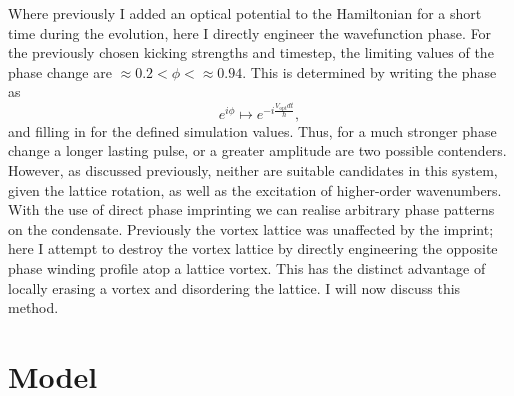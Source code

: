 Where previously I added an optical potential to the Hamiltonian for a short time during the evolution, here I directly engineer the wavefunction phase. For the previously chosen kicking strengths and timestep, the limiting values of the phase change are $\approx 0.2 < \phi < \approx 0.94$. This is determined by writing the phase as
\begin{equation}
    e^{i\phi} \mapsto e^{-i\frac{V_\textrm{opt}dt}{\hbar}},
\end{equation}
and filling in for the defined simulation values. Thus, for a much stronger phase change a longer lasting pulse, or a greater amplitude are two possible contenders. However, as discussed previously, neither are suitable candidates in this system, given the lattice rotation, as well as the excitation of higher-order wavenumbers. With the use of direct phase imprinting we can realise arbitrary phase patterns on the condensate. Previously the vortex lattice was unaffected by the imprint; here I attempt to destroy the vortex lattice by directly engineering the opposite phase winding profile atop a lattice vortex. This has the distinct advantage of locally erasing a vortex and disordering the lattice. I will now discuss this method.

\section{Model}



